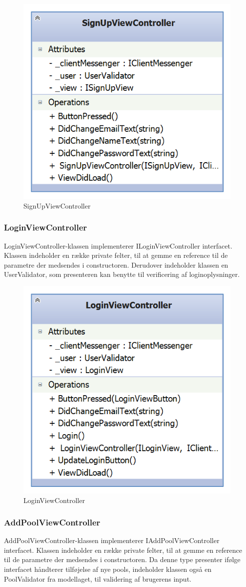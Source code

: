 \begin{figure}
	\centering
	\includegraphics[width=0.3\linewidth]{figs/design/application_signupviewcontroller}
	\caption{SignUpViewController}
	\label{fig:application_signupviewcontroller}
\end{figure}

\subsubsection{LoginViewController}
LoginViewController-klassen implementerer ILoginViewController interfacet. Klassen indeholder en række private felter, til at gemme en reference til de parametre der medsendes i constructoren. Derudover indeholder klassen en UserValidator, som presenteren kan benytte til verificering af loginoplysninger.

\begin{figure}
	\centering
	\includegraphics[width=0.3\linewidth]{figs/design/application_loginviewcontroller}
	\caption{LoginViewController}
	\label{fig:application_loginviewcontroller}
\end{figure}

\subsubsection{AddPoolViewController}
AddPoolViewController-klassen implementerer IAddPoolViewController interfacet. Klassen indeholder en række private felter, til at gemme en reference til de parametre der medsendes i constructoren. Da denne type presenter ifølge interfacet håndterer tilføjelse af nye pools, indeholder klassen også en PoolValidator fra modellaget, til validering af brugerens input.

